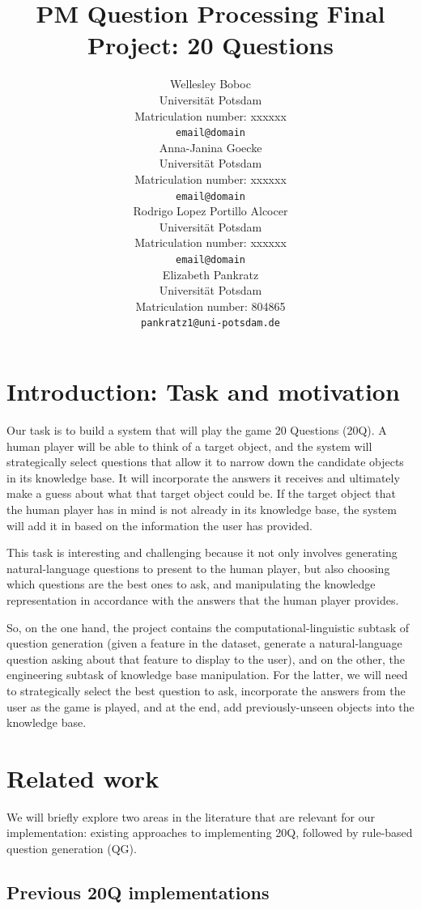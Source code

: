 \documentclass[11pt,a4paper]{article}
\title{PM Question Processing Final Project: 20 Questions}
\author{Wellesley Boboc \\
Universit{\"a}t Potsdam \\
Matriculation number: xxxxxx \\
\texttt{email@domain} \\\And
Anna-Janina Goecke \\
Universit{\"a}t Potsdam \\
Matriculation number: xxxxxx \\
\texttt{email@domain} \\\AND
Rodrigo Lopez Portillo Alcocer \\
Universit{\"a}t Potsdam \\
Matriculation number: xxxxxx \\
\texttt{email@domain} \\\And
Elizabeth Pankratz \\
Universit{\"a}t Potsdam \\
Matriculation number: 804865 \\
\texttt{pankratz1@uni-potsdam.de} \\}
\date{}
\begin{document}
\maketitle

\begin{abstract}
\lipsum[1]
\end{abstract}

\section{Introduction: Task and motivation}
\label{sec:intro}

Our task is to build a system that will play the game 20 Questions (20Q).
A human player will be able to think of a target object, and the system will strategically select questions that allow it to narrow down the candidate objects in its knowledge base.
It will incorporate the answers it receives and ultimately make a guess about what that target object could be.
If the target object that the human player has in mind is not already in its knowledge base, the system will add it in based on the information the user has provided.

This task is interesting and challenging because it not only involves generating natural-language questions to present to the human player, but also choosing which questions are the best ones to ask, and manipulating the knowledge representation in accordance with the answers that the human player provides.

So, on the one hand, the project contains the computational-linguistic subtask of question generation (given a feature in the dataset, generate a natural-language question asking about that feature to display to the user), and on the other, the engineering subtask of knowledge base manipulation.
For the latter, we will need to strategically select the best question to ask, incorporate the answers from the user as the game is played, and at the end, add previously-unseen objects into the knowledge base.

\section{Related work}
\label{sec:litreview}

We will briefly explore two areas in the literature that are relevant for our implementation: existing approaches to implementing 20Q, followed by rule-based question generation (QG).

\subsection{Previous 20Q implementations}
\label{subsec:prev20q}
\end{document}

